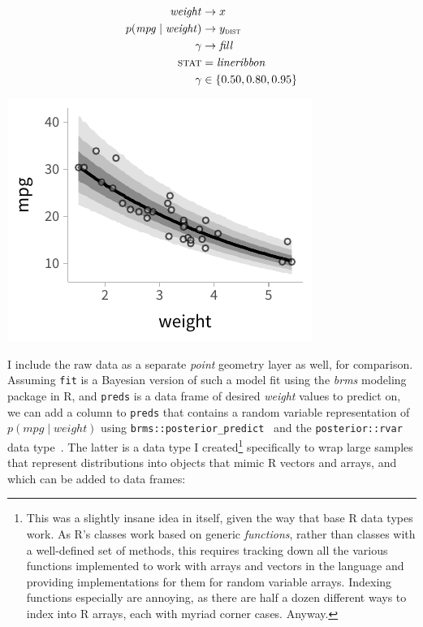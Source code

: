 \documentclass[journal]{vgtc}                     %
\begin{document}
\noindent
\begin{minipage}{.5\columnwidth}

\begin{align*}
\mathit{weight} &\rightarrow x\\
p(\mathit{mpg} \mid \mathit{weight}) &\rightarrow y_\textsc{dist}\\
\gamma &\rightarrow \mathit{fill}\\
\textsc{stat} &= \mathit{lineribbon}\\
\gamma &\in \{0.50, 0.80, 0.95\}
\end{align*}
\end{minipage}%
  \begin{minipage}{.4\columnwidth}
    \centering
    \includegraphics[width=1.2\columnwidth]{figs/3-lineribbon.pdf}
  \end{minipage}
\hfill\break


I include the raw data as a separate \textit{point} geometry layer as well, for comparison. Assuming \texttt{fit}  is a Bayesian version of such a model fit using the \textit{brms} modeling package in R, and \texttt{preds} is a data frame of desired \textit{weight} values to predict on, we can add a column to \texttt{preds} that contains a random variable representation of $p(\mathit{mpg} \mid \mathit{weight})$ using \texttt{brms::posterior\_predict}~\cite{burkner2018brms} and the \texttt{posterior::rvar}  data type~\cite{burkner2022posterior}. The latter is a data type I created\footnote{This was a slightly insane idea in itself, given the way that base R data types work. As R's classes work based on generic \textit{functions}, rather than classes with a well-defined set of methods, this requires tracking down all the various functions implemented to work with arrays and vectors in the language and providing implementations for them for random variable arrays. Indexing functions especially are annoying, as there are half a dozen different ways to index into R arrays, each with myriad corner cases. Anyway.} specifically to wrap large samples that represent distributions into objects that mimic R vectors and arrays, and which can be added to data frames:
\end{document}
